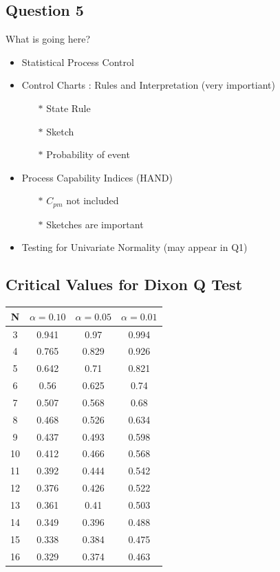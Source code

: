 \documentclass[a4paper,12pt]{article}
\begin{document}
\subsection*{Question 5}
\begin{framed}
	What is going here?
\begin{itemize}
\item Statistical Process Control
\item Control Charts : Rules and Interpretation (very importiant)
		\begin{itemize}
			\item[$\ast$] State Rule
			\item[$\ast$] Sketch
			\item[$\ast$] Probability of event
		\end{itemize}
			
\item Process Capability Indices (HAND)
\begin{itemize}
	\item[$\ast$] $C_{pm}$  not included
	\item[$\ast$] Sketches are important
\end{itemize}
\item Testing for Univariate Normality (may appear in Q1)
\end{itemize}
\end{framed}
\newpage
\subsection*{Critical Values for Dixon Q Test}
{
	\Large
	\begin{center}
	\begin{tabular}{|c|c|c|c|}
		\hline  N  & $\alpha=0.10$  & $\alpha=0.05$  & $\alpha=0.01$  \\ \hline
		3  & 0.941 & 0.97  & 0.994 \\ \hline
		4  & 0.765 & 0.829 & 0.926 \\ \hline
		5  & 0.642 & 0.71  & 0.821 \\ \hline
		6  & 0.56  & 0.625 & 0.74  \\ \hline
		7  & 0.507 & 0.568 & 0.68  \\ \hline
		8  & 0.468 & 0.526 & 0.634 \\ \hline
		9  & 0.437 & 0.493 & 0.598 \\ \hline
		10 & 0.412 & 0.466 & 0.568 \\ \hline
		11 & 0.392 & 0.444 & 0.542 \\ \hline
		12 & 0.376 & 0.426 & 0.522 \\ \hline
		13 & 0.361 & 0.41  & 0.503 \\ \hline
		14 & 0.349 & 0.396 & 0.488 \\ \hline
		15 & 0.338 & 0.384 & 0.475 \\ \hline
		16 & 0.329 & 0.374 & 0.463 \\ \hline
	\end{tabular} 
\end{center}
}
\end{document}
